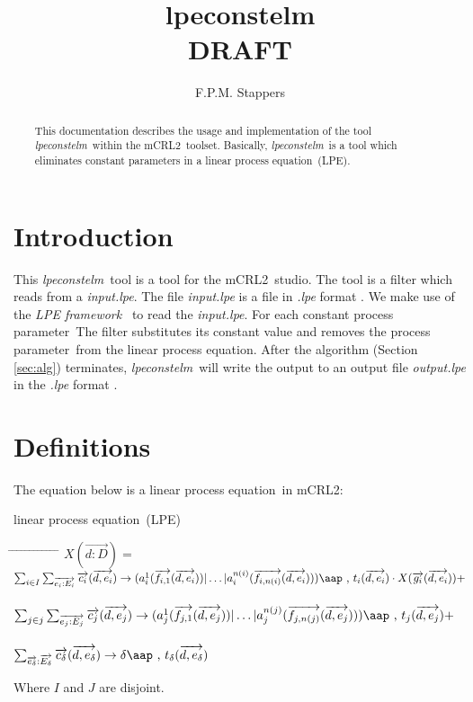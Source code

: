 \index{}\documentclass[a4paper,10pt]{article}
\title{lpeconstelm \\ DRAFT}
\author{F.P.M. Stappers}
\theoremstyle{plain}
\theoremstyle{definition}
\newcommand{\lpe}{linear process equation}
\newcommand{\tool}{\textit{lpeconstelm}}
\newcommand{\ovr}{\overrightarrow}
\newcommand{\mcrl}{mCRL2}
\newcommand{\framework}{\textit{LPE framework} \cite{LPEframework}}
\newcommand{\pp}{process parameter}
\newcommand{\ti}{\textit}
\newcommand{\tab}{\hspace*{5.mm} \= \hspace*{5.mm} \= \hspace*{5.mm} \= \hspace*{5.mm} \= \hspace*{5.mm} \= \hspace*{5.mm}  \= \hspace*{5.mm}  \= \hspace*{5.mm}  \= \hspace*{5.mm} \= \hspace*{5.mm} \= \hspace*{5.mm}  \= \hspace*{5.mm}  \= \hspace*{5.mm}\kill}
\newcommand{\at}[1]{\mbox{\aap ,} #1}
\begin{document}
\maketitle

\begin{abstract}
This documentation describes the usage and implementation of the tool \tool\ within the \mcrl\ toolset.
Basically, \tool\ is a tool which eliminates constant parameters in a \lpe\ (LPE).
\end{abstract}

\tableofcontents

\section{Introduction}
This \tool\ tool is a tool for the \mcrl\ studio. The tool is a
filter which reads from a \ti{input.lpe}. The file \ti{input.lpe} is
a file in \ti{.lpe} format \cite{LPEformat}. We make use of the
\framework\ to read the \ti{input.lpe}. For
each constant \pp\ The filter substitutes its constant value and removes the \pp\ from the
\lpe . After the algorithm (Section \ref{sec:alg}) terminates, \tool\
will write the output to an output file \ti{output.lpe} in the \ti{.lpe} format \cite{LPEformat}.

\section{Definitions} \label{sec:def}

The equation below is a \lpe\ in \mcrl : 
\begin{defn}\lpe\ (LPE) \newline
\begin{tabbing}
\tab
$X (\ovr{d: D}) = $ \> \> \> $ \sum_{i \in I} \sum_{\ovr{e_i: E_i}} \ovr{c_i} ( \ovr{d, e_i }) \rightarrow 
(a_i^1 (\ovr{f_{i,1}}(\ovr{d,e_i})) \vert \ldots \vert a_i^{n(i)}(\ovr{f_{i,n(i)}}(\ovr{d,e_i}))) \at \text{ } t_i(\ovr{d,e_i})  \cdot X(\ovr{g_i}(\ovr{d,e_i})) +$ \\ \\
\> \> \> $ \sum_{j \in j} \sum_{\ovr{e_j: E_j}} \ovr{c_j} ( \ovr{d, e_j} ) \rightarrow 
(a_j^1 (\ovr{f_{j,1}}(\ovr{d,e_j})) \vert \ldots \vert a_j^{n(j)}(\ovr{f_{j,n(j)}}(\ovr{d,e_j}))) \at \text{ } t_j(\ovr{d,e_j}) + $ \\ \\
\> \> \> $\sum_{\ovr{e_\delta}:\ovr{E_\delta}} \ovr{c_\delta} ( \ovr{d, e_\delta}) \rightarrow 
\delta \at \text{ } t_\delta(\ovr{d,e_\delta})$ 
\end{tabbing}

Where $I$ and $J$ are disjoint.\\
\end{defn}
\end{document}
